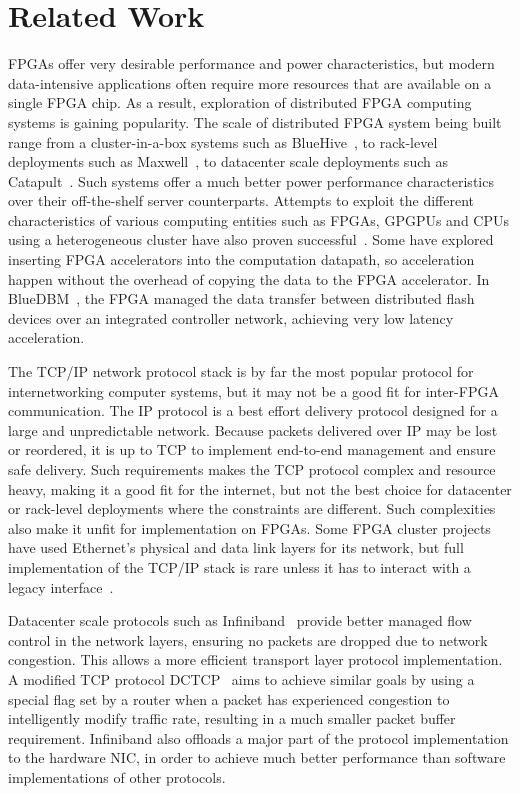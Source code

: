 \section{Related Work}
\label{sec:related}

FPGAs offer very desirable performance and power characteristics,
but modern data-intensive applications often require more resources that are
available on a single FPGA chip. As a result, exploration of distributed FPGA
computing systems is gaining popularity. The scale of distributed FPGA system
being built range from a cluster-in-a-box systems such as
BlueHive~\cite{bluehive}, to rack-level deployments such as
Maxwell~\cite{maxwell_supercomputer}, to datacenter scale deployments such as
Catapult~\cite{msr_catapult}. Such systems offer a much better power performance
characteristics over their off-the-shelf server counterparts.
Attempts to
exploit the different characteristics of various computing entities such as
FPGAs, GPGPUs and CPUs using a heterogeneous cluster have also proven
successful~\cite{axel_hetero}. Some have explored inserting FPGA accelerators
into the computation datapath, so acceleration happen without the overhead of
copying the data to the FPGA accelerator. In BlueDBM~\cite{bluedbm}, the FPGA
managed the data transfer between distributed flash devices over an integrated
controller network, achieving very low latency acceleration.

The TCP/IP network protocol stack is by far the most popular protocol for
internetworking computer systems, but it may not be a good fit for inter-FPGA
communication. The IP protocol is a best
effort delivery protocol designed for a large and unpredictable network. Because
packets delivered over IP may be lost or reordered, it is up to TCP to implement
end-to-end management and ensure safe delivery. Such requirements makes the TCP
protocol complex and resource heavy, making it a good fit for the internet, but
not the best choice for datacenter or rack-level deployments where the
constraints are different. Such complexities also make it unfit for
implementation on FPGAs. Some FPGA cluster projects have used Ethernet's
physical and data link layers for its network, but full implementation of the
TCP/IP stack is rare unless it has to interact with a legacy
interface~\cite{xilinxmemcached}.

Datacenter scale protocols such as Infiniband~\cite{infiniband} provide better
managed flow control in the network layers, ensuring no packets are dropped due
to network congestion. This allows a more efficient transport layer protocol
implementation. A modified TCP protocol DCTCP~\cite{dctcp} aims to achieve
similar goals by using a special flag set by a router when a packet has
experienced congestion to intelligently modify traffic rate, resulting in a much
smaller packet buffer requirement.  Infiniband also offloads a major part of the
protocol implementation to the hardware NIC, in order to achieve much better
performance than software implementations of other protocols.

